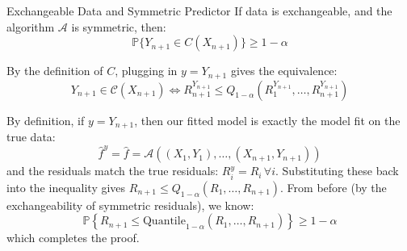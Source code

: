 \begin{thm}{Exchangeable Data and Symmetric Predictor}{}
If data is exchangeable, and the algorithm $\mathcal{A}$ is symmetric, then:
\[ \mathbb{P} \{Y_{n+1} \in C(X_{n+1})\} \ge 1-\alpha \]
\end{thm}

\begin{pr}
By the definition of $C$, plugging in $y = Y_{n+1}$ gives the equivalence:
\[ Y_{n+1} \in \mathcal{C}(X_{n+1}) \iff R_{n+1}^{Y_{n+1}} \le Q_{1-\alpha}(R_1^{Y_{n+1}}, \dots, R_{n+1}^{Y_{n+1}}) \]

\noindent By definition, if $y = Y_{n+1}$, then our fitted model is exactly the model fit on the true data:
\[ \hat{f}^y = \hat{f} = \mathcal{A}((X_1, Y_1), \dots, (X_{n+1}, Y_{n+1})) \]
and the residuals match the true residuals: $R_i^y = R_i \, \forall i$. Substituting these back into the inequality gives $R_{n+1} \le Q_{1-\alpha}(R_1, \dots, R_{n+1})$. From before (by the exchangeability of symmetric residuals), we know:
\[ \mathbb{P} \left\{ R_{n+1} \le \text{Quantile}_{1-\alpha}(R_1, \dots, R_{n+1}) \right\} \ge 1-\alpha \]
which completes the proof.
\end{pr}

